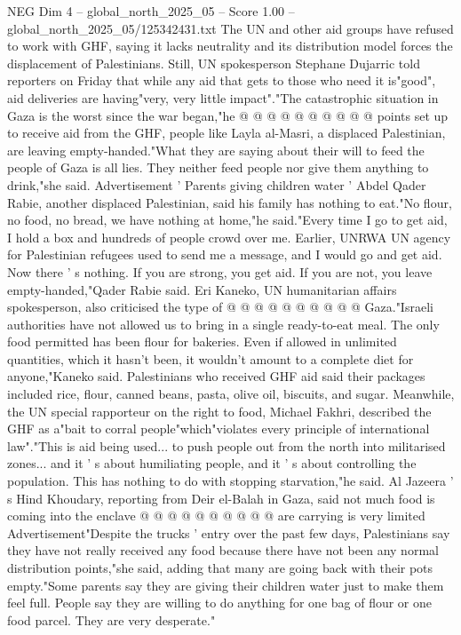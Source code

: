 \begin{textsample}{NEG Dim 4 – global\_north\_2025\_05 – Score 1.00 – global\_north\_2025\_05/125342431.txt}
The UN and other aid groups have refused to work with GHF, saying it lacks neutrality and its distribution model forces the displacement of Palestinians.
Still, UN spokesperson Stephane Dujarric told reporters on Friday that while any aid that gets to those who need it is"good", aid deliveries are having"very, very little impact"."The catastrophic situation in Gaza is the worst since the war began,"he @ @ @ @ @ @ @ @ @ @ points set up to receive aid from the GHF, people like Layla al-Masri, a displaced Palestinian, are leaving empty-handed."What they are saying about their will to feed the people of Gaza is all lies.
They neither feed people nor give them anything to drink,"she said.
Advertisement ' Parents giving children water ' Abdel Qader Rabie, another displaced Palestinian, said his family has nothing to eat."No flour, no food, no bread, we have nothing at home,"he said."Every time I go to get aid, I hold a box and hundreds of people crowd over me.
Earlier, UNRWA UN agency for Palestinian refugees used to send me a message, and I would go and get aid.
Now there ' s nothing.
If you are strong, you get aid.
If you are not, you leave empty-handed,"Qader Rabie said.
Eri Kaneko, UN humanitarian affairs spokesperson, also criticised the type of @ @ @ @ @ @ @ @ @ @ Gaza."Israeli authorities have not allowed us to bring in a single ready-to-eat meal.
The only food permitted has been flour for bakeries.
Even if allowed in unlimited quantities, which it hasn't been, it wouldn't amount to a complete diet for anyone,"Kaneko said.
Palestinians who received GHF aid said their packages included rice, flour, canned beans, pasta, olive oil, biscuits, and sugar.
Meanwhile, the UN special rapporteur on the right to food, Michael Fakhri, described the GHF as a"bait to corral people"which"violates every principle of international law"."This is aid being used... to push people out from the north into militarised zones... and it ' s about humiliating people, and it ' s about controlling the population.
This has nothing to do with stopping starvation,"he said.
Al Jazeera ' s Hind Khoudary, reporting from Deir el-Balah in Gaza, said not much food is coming into the enclave @ @ @ @ @ @ @ @ @ @ are carrying is very limited Advertisement"Despite the trucks ' entry over the past few days, Palestinians say they have not really received any food because there have not been any normal distribution points,"she said, adding that many are going back with their pots empty."Some parents say they are giving their children water just to make them feel full.
People say they are willing to do anything for one bag of flour or one food parcel.
They are very desperate."

\end{textsample}

